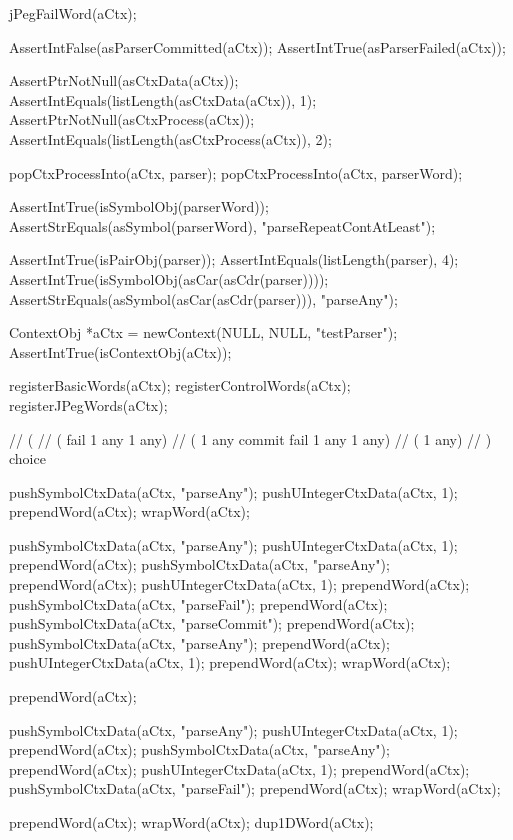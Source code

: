   jPegFailWord(aCtx);
  
  AssertIntFalse(asParserCommitted(aCtx));
  AssertIntTrue(asParserFailed(aCtx));
  
  AssertPtrNotNull(asCtxData(aCtx));
  AssertIntEquals(listLength(asCtxData(aCtx)), 1);
  AssertPtrNotNull(asCtxProcess(aCtx));
  AssertIntEquals(listLength(asCtxProcess(aCtx)), 2);
  
  popCtxProcessInto(aCtx, parser);
  popCtxProcessInto(aCtx, parserWord);
  
  AssertIntTrue(isSymbolObj(parserWord));
  AssertStrEquals(asSymbol(parserWord), "parseRepeatContAtLeast");
  
  AssertIntTrue(isPairObj(parser));
  AssertIntEquals(listLength(parser), 4);
  AssertIntTrue(isSymbolObj(asCar(asCdr(parser))));
  AssertStrEquals(asSymbol(asCar(asCdr(parser))), "parseAny");
\stopCTest
\stopTestCase


\startCTest
  ContextObj *aCtx = newContext(NULL, NULL, "testParser");
  AssertIntTrue(isContextObj(aCtx));
  
  registerBasicWords(aCtx);
  registerControlWords(aCtx);
  registerJPegWords(aCtx);

  // (
  //   ( fail 1 any 1 any)
  //   ( 1 any commit fail 1 any 1 any)
  //   ( 1 any)
  // ) choice

  pushSymbolCtxData(aCtx, "parseAny");
  pushUIntegerCtxData(aCtx, 1);
  prependWord(aCtx);
  wrapWord(aCtx);
  
  pushSymbolCtxData(aCtx, "parseAny");
  pushUIntegerCtxData(aCtx, 1);
  prependWord(aCtx);
  pushSymbolCtxData(aCtx, "parseAny");
  prependWord(aCtx);
  pushUIntegerCtxData(aCtx, 1);
  prependWord(aCtx);
  pushSymbolCtxData(aCtx, "parseFail");
  prependWord(aCtx);
  pushSymbolCtxData(aCtx, "parseCommit");
  prependWord(aCtx);
  pushSymbolCtxData(aCtx, "parseAny");
  prependWord(aCtx);
  pushUIntegerCtxData(aCtx, 1);
  prependWord(aCtx);
  wrapWord(aCtx);
  
  prependWord(aCtx);
  
  pushSymbolCtxData(aCtx, "parseAny");
  pushUIntegerCtxData(aCtx, 1);
  prependWord(aCtx);
  pushSymbolCtxData(aCtx, "parseAny");
  prependWord(aCtx);
  pushUIntegerCtxData(aCtx, 1);
  prependWord(aCtx);
  pushSymbolCtxData(aCtx, "parseFail");
  prependWord(aCtx);
  wrapWord(aCtx);
  
  prependWord(aCtx);
  wrapWord(aCtx);
  dup1DWord(aCtx);
  
